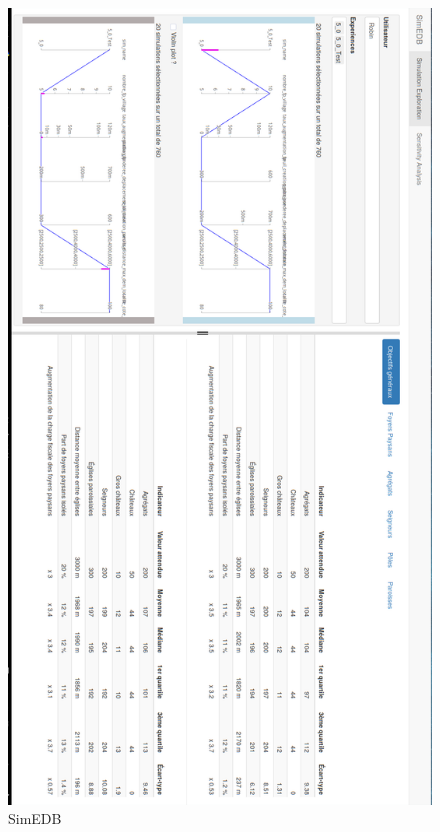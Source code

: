	\begin{figure}[H]
		\centering
		\includegraphics[width=.94\linewidth]{img/SimEDB_nombreFP_villages_rotate.png}
		\caption{SimEDB }
		\label{fig:simedb_villages}
	\end{figure}
\clearpage


